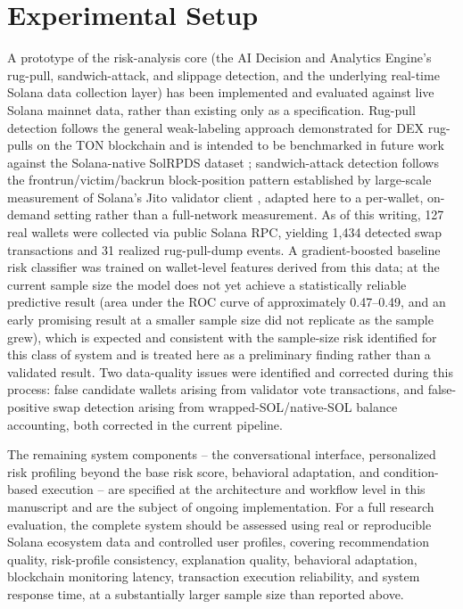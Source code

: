 \documentclass[conference]{IEEEtran}
\begin{document}
\section{Experimental Setup}

A prototype of the risk-analysis core (the AI Decision and Analytics Engine's rug-pull, sandwich-attack, and slippage detection, and the underlying real-time Solana data collection layer) has been implemented and evaluated against live Solana mainnet data, rather than existing only as a specification. Rug-pull detection follows the general weak-labeling approach demonstrated for DEX rug-pulls on the TON blockchain \cite{ref10} and is intended to be benchmarked in future work against the Solana-native SolRPDS dataset \cite{ref12}; sandwich-attack detection follows the frontrun/victim/backrun block-position pattern established by large-scale measurement of Solana's Jito validator client \cite{ref11}, adapted here to a per-wallet, on-demand setting rather than a full-network measurement. As of this writing, 127 real wallets were collected via public Solana RPC, yielding 1{,}434 detected swap transactions and 31 realized rug-pull-dump events. A gradient-boosted baseline risk classifier was trained on wallet-level features derived from this data; at the current sample size the model does not yet achieve a statistically reliable predictive result (area under the ROC curve of approximately 0.47--0.49, and an early promising result at a smaller sample size did not replicate as the sample grew), which is expected and consistent with the sample-size risk identified for this class of system and is treated here as a preliminary finding rather than a validated result. Two data-quality issues were identified and corrected during this process: false candidate wallets arising from validator vote transactions, and false-positive swap detection arising from wrapped-SOL/native-SOL balance accounting, both corrected in the current pipeline.

The remaining system components -- the conversational interface, personalized risk profiling beyond the base risk score, behavioral adaptation, and condition-based execution -- are specified at the architecture and workflow level in this manuscript and are the subject of ongoing implementation. For a full research evaluation, the complete system should be assessed using real or reproducible Solana ecosystem data and controlled user profiles, covering recommendation quality, risk-profile consistency, explanation quality, behavioral adaptation, blockchain monitoring latency, transaction execution reliability, and system response time, at a substantially larger sample size than reported above.
\end{document}
